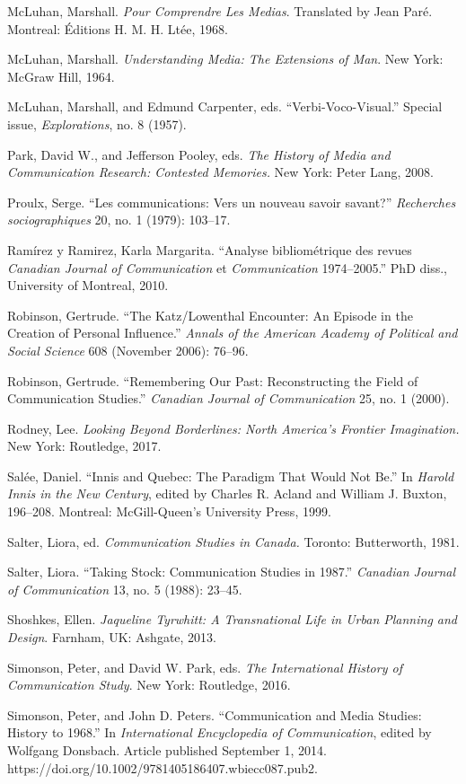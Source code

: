 \documentclass{tufte-handout}
\begin{document}
\begin{hangparas}{.25in}{1}
McLuhan, Marshall. \emph{Pour Comprendre Les Medias}. Translated by Jean
Paré. Montreal: Éditions H. M. H. Ltée, 1968.

McLuhan, Marshall. \emph{Understanding Media: The Extensions of Man}.
New York: McGraw Hill, 1964.

McLuhan, Marshall, and Edmund Carpenter, eds. ``Verbi-Voco-Visual.''
Special issue, \emph{Explorations}, no. 8 (1957).

Park, David W., and Jefferson Pooley, eds. \emph{The History of Media
and Communication Research: Contested Memories.} New York: Peter Lang,
2008.

Proulx, Serge. ``Les communications: Vers un nouveau savoir savant?''
\emph{Recherches sociographiques} 20, no. 1 (1979): 103--17.

Ramírez y Ramirez, Karla Margarita. ``Analyse bibliométrique des revues
\emph{Canadian Journal of Communication} et \emph{Communication}
1974--2005.'' PhD diss., University of Montreal, 2010.

Robinson, Gertrude. ``The Katz/Lowenthal Encounter: An Episode in the
Creation of Personal Influence.'' \emph{Annals of the American Academy
of Political and Social Science} 608 (November 2006): 76--96.

Robinson, Gertrude. ``Remembering Our Past: Reconstructing the Field of
Communication Studies.'' \emph{Canadian Journal of Communication} 25,
no. 1 (2000).

Rodney, Lee. \emph{Looking Beyond Borderlines: North America's Frontier
Imagination.} New York: Routledge, 2017.

Salée, Daniel. ``Innis and Quebec: The Paradigm That Would Not Be.'' In
\emph{Harold Innis in the New Century}, edited by Charles R. Acland and
William J. Buxton, 196--208. Montreal: McGill-Queen's University Press,
1999.

Salter, Liora, ed. \emph{Communication Studies in Canada.} Toronto:
Butterworth, 1981.

Salter, Liora. ``Taking Stock: Communication Studies in 1987.''
\emph{Canadian Journal of Communication} 13, no. 5 (1988): 23--45.

Shoshkes, Ellen. \emph{Jaqueline Tyrwhitt: A Transnational Life in Urban
Planning and Design}. Farnham, UK: Ashgate, 2013.

Simonson, Peter, and David W. Park, eds. \emph{The International History
of Communication Study}. New York: Routledge, 2016.

Simonson, Peter, and John D. Peters. ``Communication and Media Studies:
History to 1968.'' In \emph{International Encyclopedia of
Communication}, edited by Wolfgang Donsbach. Article published September
1, 2014. https://doi.org/10.1002/9781405186407.wbiecc087.pub2.


\end{hangparas}
\end{document}
